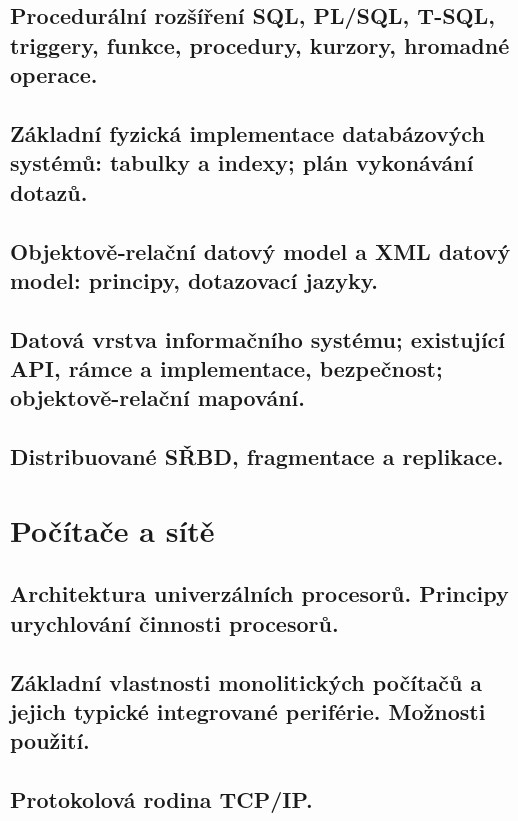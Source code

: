 \documentclass[twoside]{book}
\begin{document}
\chapter{Procedurální rozšíření SQL, PL/SQL, T-SQL, triggery, funkce, procedury, kurzory, hromadné operace.}

\clearpage

\chapter{Základní fyzická implementace databázových systémů: tabulky a indexy; plán vykonávání dotazů.}

\clearpage

\chapter{Objektově‐relační datový model a XML datový model: principy, dotazovací jazyky.}

\clearpage

\chapter{Datová vrstva informačního systému; existující API, rámce a implementace, bezpečnost; objektově-relační mapování.}

\clearpage

\chapter{Distribuované SŘBD, fragmentace a replikace.}

\clearpage

\part{Počítače a sítě}
\chapter{Architektura univerzálních procesorů. Principy urychlování činnosti procesorů. }

\clearpage

\chapter{Základní vlastnosti monolitických počítačů a jejich typické integrované periférie. Možnosti použití. }

\clearpage

\chapter{Protokolová rodina TCP/IP. }

\clearpage
\end{document}

